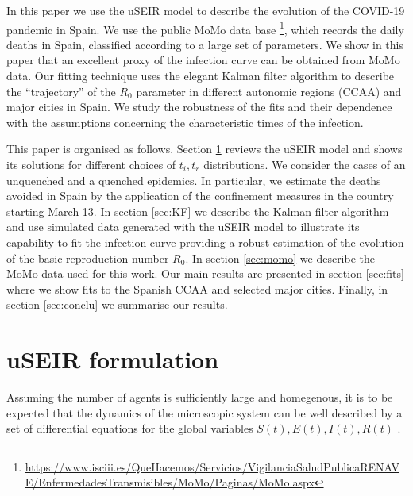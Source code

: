 \documentclass[a4paper,oneside,11pt]{article}
\begin{document}
In this paper we use the uSEIR model to describe the evolution of the COVID-19 pandemic in Spain. We use the public MoMo data base  \footnote{\url{https://www.isciii.es/QueHacemos/Servicios/VigilanciaSaludPublicaRENAVE/EnfermedadesTransmisibles/MoMo/Paginas/MoMo.aspx}}, which records the daily deaths in Spain, classified according to a large set of parameters. We show in this paper that an excellent proxy of the infection curve can be obtained from MoMo data. Our fitting technique uses the elegant Kalman filter algorithm \cite{Billoir1984, Fruhwirth1987, CerveraVillanueva2002, } to describe the ``trajectory'' of the $R_0$ parameter in different autonomic regions (CCAA) and major cities in Spain.  We study the robustness of the fits and their dependence with the assumptions concerning the characteristic times of the infection. 

This paper is organised as follows. Section \ref{sec:useir} reviews the uSEIR model and shows its solutions for different choices of $t_i, t_r$ distributions. We consider the cases of an unquenched and a quenched epidemics. In particular, we estimate the deaths avoided in Spain by the application of the confinement measures in the country starting March 13. In section \ref{sec:KF} we describe the Kalman filter algorithm and use simulated data generated with the uSEIR model to illustrate its capability to fit the infection curve providing a robust estimation of the evolution of the basic reproduction number $R_0$. In section \ref{sec:momo} we describe the MoMo data used for this work. Our main results are presented in section \ref{sec:fits} where we show fits to the Spanish CCAA and selected major cities. Finally, in section \ref{sec:conclu} we summarise our results.
 

\section{uSEIR formulation}
\label{sec:useir}
Assuming the number of agents is sufficiently large and homegenous, it is to be expected that the dynamics of the microscopic system can be well described by a set of differential equations for the global variables $S(t), E(t), I(t), R(t)$ \cite{Kermack1927}. 
\end{document}
